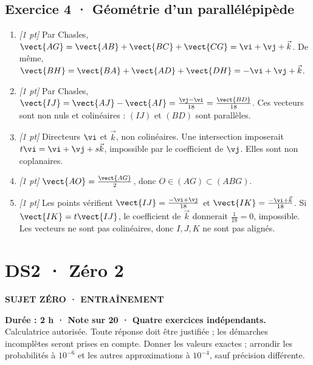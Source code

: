 \subsection*{Exercice 4 · Géométrie d'un parallélépipède}\begin{enumerate}

\item \textit{[1 pt]} Par Chasles, $\vect{AG}=\vect{AB}+\vect{BC}+\vect{CG}=\vi +\vj +\vec k$. De même, $\vect{BH}=\vect{BA}+\vect{AD}+\vect{DH}=-\vi +\vj +\vec k$.

\item \textit{[1 pt]} Par Chasles, $\vect{IJ}=\vect{AJ}-\vect{AI}=\frac{\vj -\vi }{18}=\frac{\vect{BD}}{18}$. Ces vecteurs sont non nuls et colinéaires : $(IJ)$ et $(BD)$ sont parallèles.

\item \textit{[1 pt]} Directeurs $\vi $ et $\vec k$, non colinéaires. Une intersection imposerait $t\vi =\vi +\vj +s\vec k$, impossible par le coefficient de $\vj $. Elles sont non coplanaires.

\item \textit{[1 pt]} $\vect{AO}=\frac{\vect{AG}}{2}$, donc $O\in(AG)\subset(ABG)$.

\item \textit{[1 pt]} Les points vérifient $\vect{IJ}=\frac{-\vi +\vj }{18}$ et $\vect{IK}=\frac{-\vi +\vec k}{18}$. Si $\vect{IK}=t\vect{IJ}$, le coefficient de $\vec k$ donnerait $\frac{1}{18}=0$, impossible. Les vecteurs ne sont pas colinéaires, donc $I,J,K$ ne sont pas alignés.

\end{enumerate}

\fi

\clearpage{}\label{sujet:2-2}

\section*{DS2 · Zéro 2}

{\sffamily\bfseries\color{teal}SUJET ZÉRO · ENTRAÎNEMENT\par}

\textbf{Durée : 2 h · Note sur 20 · Quatre exercices indépendants.}\\Calculatrice autorisée. Toute réponse doit être justifiée ; les démarches incomplètes seront prises en compte. Donner les valeurs exactes ; arrondir les probabilités à $10^{-6}$ et les autres approximations à $10^{-4}$, sauf précision différente.

